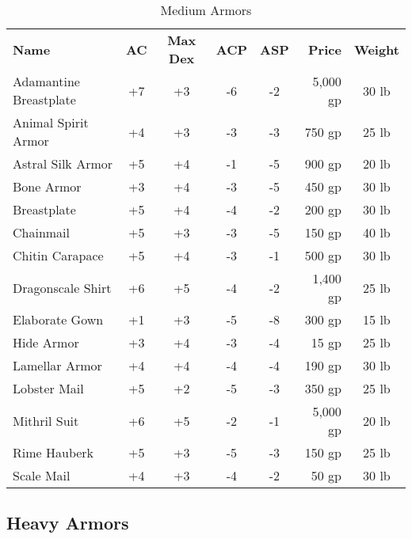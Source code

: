 \begin{table}[htb]
\caption{Medium Armors}
\centering
\begin{tabular}{l *{4}{c} r c}
\textbf{Name} & \textbf{AC} & \textbf{Max Dex} & \textbf{ACP} & \textbf{ASP} & \textbf{Price} & \textbf{Weight}\\
Adamantine Breastplate & +7 & +3 & -6 & -2 & 5,000 gp & 30 lb\\
Animal Spirit Armor & +4 & +3 & -3 & -3 & 750 gp & 25 lb\\
Astral Silk Armor & +5 & +4 & -1 & -5 & 900 gp & 20 lb\\
Bone Armor & +3 & +4 & -3 & -5 & 450 gp & 30 lb\\
Breastplate & +5 & +4 & -4 & -2 & 200 gp & 30 lb\\
Chainmail & +5 & +3 & -3 & -5 & 150 gp & 40 lb\\
Chitin Carapace & +5 & +4 & -3 & -1 & 500 gp & 30 lb\\
Dragonscale Shirt & +6 & +5 & -4 & -2 & 1,400 gp & 25 lb\\
Elaborate Gown & +1 & +3 & -5 & -8 & 300 gp & 15 lb\\
Hide Armor & +3 & +4 & -3 & -4 & 15 gp & 25 lb\\
Lamellar Armor & +4 & +4 & -4 & -4 & 190 gp & 30 lb\\
Lobster Mail & +5 & +2 & -5 & -3 & 350 gp & 25 lb\\
Mithril Suit & +6 & +5 & -2 & -1 & 5,000 gp & 20 lb\\
Rime Hauberk & +5 & +3 & -5 & -3 & 150 gp & 25 lb\\
Scale Mail & +4 & +3 & -4 & -2 & 50 gp & 30 lb\\
\end{tabular}
\end{table}


\subsection{Heavy Armors}


